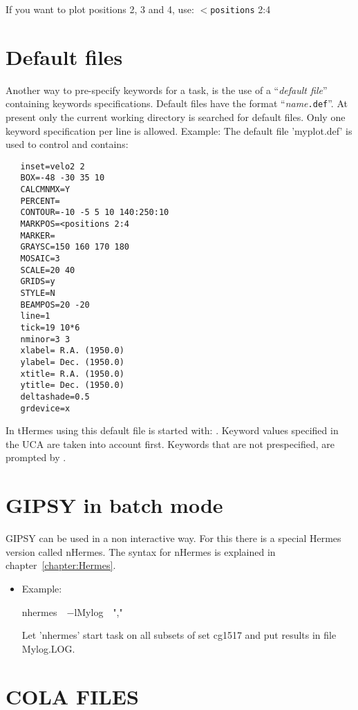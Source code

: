 If you want to plot positions 2, 3 and 4, use:
$<${\tt positions} 2:4


\section{Default files}

Another way to pre-specify keywords for a task, is the use
of a ``{\em default file\/}''  containing keywords specifications.
Default files have the format  ``{\it name\/}{\tt .def}''. 
At present only the current working directory is searched for default files.
Only one keyword specification per line is allowed.
Example: The default file 'myplot.def' is used to control  and
contains:
\begin{verbatim}
   inset=velo2 2
   BOX=-48 -30 35 10
   CALCMNMX=Y
   PERCENT=
   CONTOUR=-10 -5 5 10 140:250:10
   MARKPOS=<positions 2:4
   MARKER=
   GRAYSC=150 160 170 180
   MOSAIC=3
   SCALE=20 40
   GRIDS=y
   STYLE=N
   BEAMPOS=20 -20
   line=1
   tick=19 10*6
   nminor=3 3
   xlabel= R.A. (1950.0)
   ylabel= Dec. (1950.0)
   xtitle= R.A. (1950.0)
   ytitle= Dec. (1950.0)
   deltashade=0.5
   grdevice=x
\end{verbatim}

In tHermes  using this default file is started with:
.
Keyword values specified in the UCA are taken into account first.
Keywords that are not prespecified, are prompted by .


\section{GIPSY in batch mode}
GIPSY can be used in a non interactive way. For this there is a special
Hermes version called nHermes. The syntax for nHermes is explained in
chapter~\ref{chapter:Hermes}.
\begin{itemize}
\item Example:
		
nhermes\ \ $-$lMylog\ \  ","

Let 'nhermes' start task  on all subsets of set cg1517 and put
results in file {Mylog.LOG.}
\end{itemize}


\section{COLA FILES}
\label{chapter:Cola}
